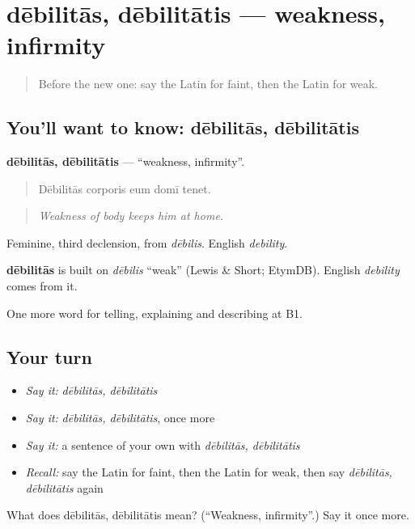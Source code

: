 \section[dēbilitās, dēbilitātis]{dēbilitās, dēbilitātis — weakness, infirmity}

\label{lesson:LA-C521-debilitas}



\begin{quote}
Before the new one: say the Latin for faint, then the Latin for weak.
\end{quote}

\subsection*{You'll want to know: dēbilitās, dēbilitātis}
\textbf{dēbilitās, dēbilitātis} — \textquotedblleft{}weakness, infirmity\textquotedblright{}.

\begin{quote}
Dēbilitās corporis eum domī tenet.
\end{quote}

\begin{quote}
\emph{Weakness of body keeps him at home.}
\end{quote}

Feminine, third declension, from \emph{dēbilis}. English \emph{debility}.

\begin{cousinweb}
\textbf{dēbilitās} is built on \emph{dēbilis} \textquotedblleft{}weak\textquotedblright{} (Lewis \& Short; EtymDB). English \emph{debility} comes from it.
\end{cousinweb}

\begin{grammarlens}[title={What you've built}]
One more word for telling, explaining and describing at B1.
\end{grammarlens}

\subsection*{Your turn}
\begin{itemize}
\raggedright
  \item \emph{Say it:} \emph{dēbilitās, dēbilitātis}
  \item \emph{Say it:} \emph{dēbilitās, dēbilitātis}, once more
  \item \emph{Say it:} a sentence of your own with \emph{dēbilitās, dēbilitātis}
  \item \emph{Recall:} say the Latin for faint, then the Latin for weak, then say \emph{dēbilitās, dēbilitātis} again
\end{itemize}

\begin{tcolorbox}[breakable,colback=teal!4,colframe=teal!35!black,title={Before you move on}]
What does dēbilitās, dēbilitātis mean? (\textquotedblleft{}Weakness, infirmity\textquotedblright{}.) Say it once more.
\end{tcolorbox}
